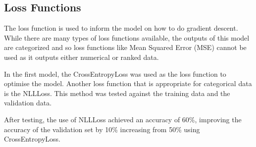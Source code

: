 \documentclass[../main.tex]{subfiles}
\begin{document}
\subsection{Loss Functions}

The loss function is used to inform the model on how to do gradient descent. While there are many types of loss functions available, the outputs of this model are categorized and so loss functions like Mean Squared Error (MSE) cannot be used as it outputs either numerical or ranked data. 

In the first model, the CrossEntropyLoss was used as the loss function to optimise the model. Another loss function that is appropriate for categorical data is the NLLLoss. This method was tested against the training data and the validation data.  

After testing, the use of NLLLoss achieved an accuracy of 60\%, improving the accuracy of the validation set by 10\% increasing from 50\% using CrossEntropyLoss. 
\end{document}
